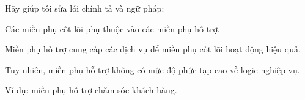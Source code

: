 Hãy giúp tôi sửa lỗi chính tả và ngữ pháp:



Các miền phụ cốt lõi phụ thuộc vào các miền phụ hỗ trợ.

Miền phụ hỗ trợ cung cấp các dịch vụ để miền phụ cốt lõi hoạt động hiệu quả.

Tuy nhiên, miền phụ hỗ trợ không có mức độ phức tạp cao về logic nghiệp vụ.

Ví dụ: miền phụ hỗ trợ chăm sóc khách hàng.  

